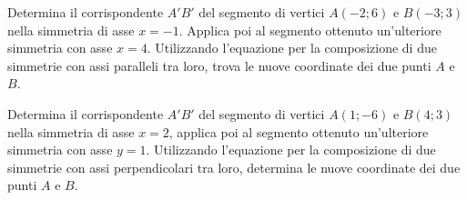 \begin{esercizio}
	\label{ese:8.98} %
	Determina il corrispondente \(A'B'\) del segmento di vertici \(A(-2;6)\) 
	e \(B(-3;3)\) nella simmetria di asse \(x=-1\). Applica poi al segmento 
	ottenuto un'ulteriore simmetria con asse \(x=4\). Utilizzando 
	l'equazione per la composizione di due simmetrie con assi paralleli 
	tra loro, trova le nuove coordinate dei due punti \(A\) e \(B\).
\end{esercizio}

\begin{esercizio}
	\label{ese:8.99} %
	Determina il corrispondente \(A'B'\) del segmento di vertici \(A(1;-6)\) 
	e \(B(4;3)\) nella simmetria di asse \(x = 2\), applica poi al segmento 
	ottenuto un'ulteriore simmetria con asse \(y = 1\). Utilizzando 
	l'equazione per la composizione di due simmetrie con assi 
	perpendicolari tra loro, determina le nuove coordinate dei due punti 
	\(A\) e \(B\).
\end{esercizio}


